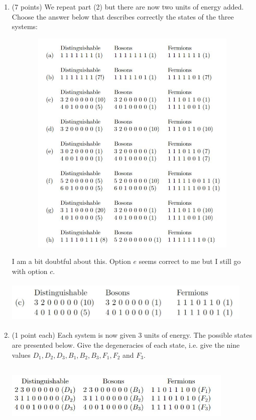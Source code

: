 \documentclass[fleqn]{article}
\begin{document}
\begin{enumerate}
    \item (7 points) We repeat part (2) but there are now two units of energy added. Choose the answer
    below that describes correctly the states of the three systems:
    \begin{center}
      \includegraphics[height=11cm, width=15cm]{3.JPG}
    \end{center}

      \textcolor{hwColor}{
        I am  a bit doubtful about this. Option $e$ seems correct to me but I still go with option $c$.
      }
      \begin{center}
        \includegraphics[height=2cm, width=12cm]{Answer3.JPG}
      \end{center}

    \pagebreak

    \item (1 point each) Each system is now given $3$ units of energy. The possible states are presented
    below. Give the degeneracies of each state, i.e. give the nine values $D_1, D_2, D_3, B_1, B_2, B_3,
    F_1, F_2$ and $F_3$.
    \begin{center}
      \includegraphics[height=3cm, width=11cm]{4.JPG}
    \end{center}


\end{enumerate}
\end{document}

